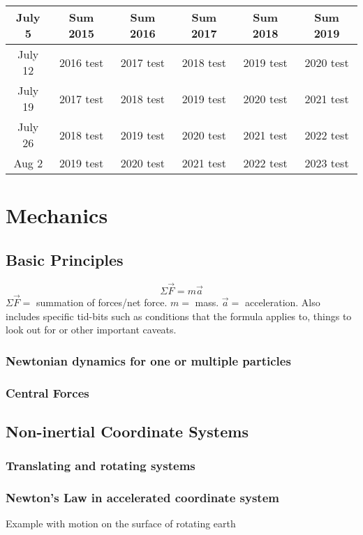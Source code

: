 \documentclass[]{article}
\begin{document}
\begin{center}
\begin{tabular}{c|c|c|c|c|c}
        \hline
        July 5 & Sum 2015 & Sum 2016 & Sum 2017 & Sum 2018 & Sum 2019 \\
        \hline
        July 12 & 2016 test & 2017 test & 2018 test & 2019 test & 2020 test \\
        \hline
        July 19 & 2017 test & 2018 test & 2019 test & 2020 test & 2021 test \\
        \hline
        July 26 & 2018 test & 2019 test & 2020 test & 2021 test & 2022 test \\
        \hline
        Aug 2 & 2019 test & 2020 test & 2021 test & 2022 test & 2023 test \\
        \hline
    \end{tabular}
\end{center}
\section{Mechanics}
\subsection{Basic Principles}
\begin{equation}
    \Sigma \vec{F} = m \vec{a}
\end{equation}
$\Sigma \vec{F} = $ summation of forces/net force.
   $ m = $ mass.
    $\vec{a} = $ acceleration. Also includes specific tid-bits such as conditions that the formula applies to, things to look out for or other important caveats.
\subsubsection{Newtonian dynamics for one or multiple particles}
\subsubsection{Central Forces}

\subsection{Non-inertial Coordinate Systems}
\subsubsection{Translating and rotating systems}
\subsubsection{Newton's Law in accelerated coordinate system}
Example with motion on the surface of rotating earth 
\end{document}
